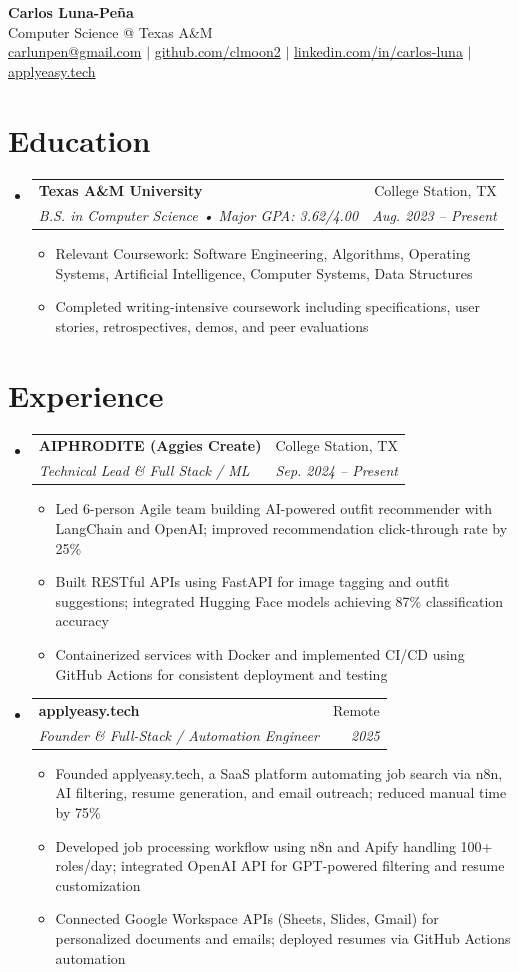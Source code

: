 \documentclass[letterpaper,11pt]{article}
\makeatletter
\newcommand{\resumeItem}[1]{
  \item\small{{#1 \vspace{-2pt}}}
}
\newcommand{\resumeSubheading}[4]{
  \vspace{-2pt}\item
    \begin{tabular*}{0.97\textwidth}[t]{l@{\extracolsep{\fill}}r}
      \textbf{#1} & #2 \\
      \textit{\small#3} & \textit{\small #4} \\
    \end{tabular*}\vspace{-7pt}
}
\newcommand{\resumeSubHeadingListStart}{\begin{itemize}[leftmargin=0.15in, label={}]}
\newcommand{\resumeSubHeadingListEnd}{\end{itemize}}
\newcommand{\resumeItemListStart}{\begin{itemize}}
\newcommand{\resumeItemListEnd}{\end{itemize}\vspace{-5pt}}
\makeatother
\begin{document}
\begin{center}
  \textbf{\Huge Carlos Luna-Pe\~na} \\
  \vspace{2pt}
  Computer Science @ Texas A\&M \\
  \vspace{2pt}
  \href{mailto:carlunpen@gmail.com}{carlunpen@gmail.com} $|$ \href{https://github.com/clmoon2}{github.com/clmoon2} $|$ \href{https://linkedin.com/in/carlos-luna}{linkedin.com/in/carlos-luna} $|$ \href{https://applyeasy.tech}{applyeasy.tech}
\end{center}

\section{Education}
\resumeSubHeadingListStart
  \resumeSubheading
    {Texas A\&M University}{College Station, TX}
    {B.S. in Computer Science • Major GPA: 3.62/4.00}{Aug. 2023 – Present}
    \resumeItemListStart
      \resumeItem{Relevant Coursework: Software Engineering, Algorithms, Operating Systems, Artificial Intelligence, Computer Systems, Data Structures}
      \resumeItem{Completed writing-intensive coursework including specifications, user stories, retrospectives, demos, and peer evaluations}
    \resumeItemListEnd
\resumeSubHeadingListEnd

\section{Experience}
\resumeSubHeadingListStart
  \resumeSubheading
    {AIPHRODITE (Aggies Create)}{College Station, TX}
    {Technical Lead \& Full Stack / ML}{Sep. 2024 – Present}
    \resumeItemListStart
      \resumeItem{Led 6-person Agile team building AI-powered outfit recommender with LangChain and OpenAI; improved recommendation click-through rate by 25\%}
      \resumeItem{Built RESTful APIs using FastAPI for image tagging and outfit suggestions; integrated Hugging Face models achieving 87\% classification accuracy}
      \resumeItem{Containerized services with Docker and implemented CI/CD using GitHub Actions for consistent deployment and testing}
    \resumeItemListEnd

  \resumeSubheading
    {applyeasy.tech}{Remote}
    {Founder \& Full-Stack / Automation Engineer}{2025}
    \resumeItemListStart
      \resumeItem{Founded applyeasy.tech, a SaaS platform automating job search via n8n, AI filtering, resume generation, and email outreach; reduced manual time by 75\%}
      \resumeItem{Developed job processing workflow using n8n and Apify handling 100+ roles/day; integrated OpenAI API for GPT-powered filtering and resume customization}
      \resumeItem{Connected Google Workspace APIs (Sheets, Slides, Gmail) for personalized documents and emails; deployed resumes via GitHub Actions automation}
    \resumeItemListEnd
\resumeSubHeadingListEnd
\end{document}
